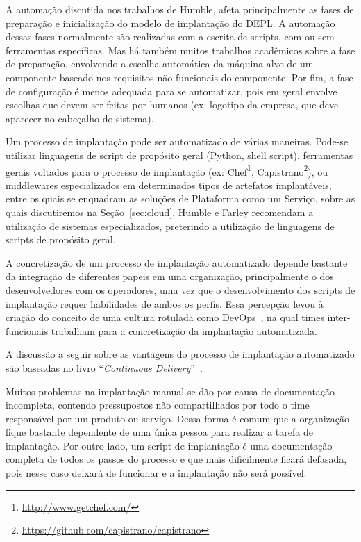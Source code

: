A automação discutida nos trabalhos de Humble, afeta principalmente as fases de preparação e inicialização do modelo de implantação do DEPL. A automação dessas fases normalmente são realizadas com a escrita de scripts, com ou sem ferramentas específicas. Mas há também muitos trabalhos acadêmicos sobre a fase de preparação, envolvendo a escolha automática da máquina alvo de um componente baseado nos requisitos não-funcionais do componente. Por fim, a fase de configuração é menos adequada para se automatizar, pois em geral envolve escolhas que devem ser feitas por humanos (ex: logotipo da empresa, que deve aparecer no cabeçalho do sistema).

Um processo de implantação pode ser automatizado de várias maneiras.
Pode-se utilizar linguagens de script de propósito geral (Python, shell script),
ferramentas gerais voltados para o processo de implantação (ex: 
Chef\footnote{\url{http://www.getchef.com/}}, Capistrano\footnote{\url{https://github.com/capistrano/capistrano}}),
ou middlewares especializados em determinados tipos de artefatos implantáveis,
entre os quais se enquadram as soluções de Plataforma como um Serviço,
sobre as quais discutiremos na Seção~\ref{sec:cloud}.
Humble e Farley recomendam a utilização de sistemas especializados, preterindo 
a utilização de linguagens de scripts de propósito geral.

A concretização de um processo de implantação automatizado depende bastante da
integração de diferentes papeis em uma organização, principalmente o dos desenvolvedores
com os operadores, uma vez que o desenvolvimento dos scripts de implantação requer
habilidades de ambos os perfis.
Essa percepção levou à criação do conceito de uma cultura 
rotulada como DevOps~\cite{Humble2011DevOps}, na qual times inter-funcionais
trabalham para a concretização da implantação automatizada.

A discussão a seguir sobre as vantagens do processo de implantação automatizado
são baseadas no livro ``\emph{Continuous Delivery}''~\cite{Humble2011Continuous}.

Muitos problemas na implantação manual se dão por causa de documentação incompleta,
contendo pressupostos não compartilhados por todo o time responsável por um produto ou serviço.
Dessa forma é comum que a organização fique bastante dependente de uma única
pessoa para realizar a tarefa de implantação.
Por outro lado, um script de implantação é uma documentação completa de todos os passos
do processo e que mais dificilmente ficará defasada,
pois nesse caso deixará de funcionar e a implantação não será possível.

